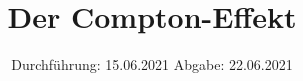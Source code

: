 

\subject{V603}
\title{Der Compton-Effekt}
\date{%
  Durchführung: 15.06.2021
  \hspace{3em}
  Abgabe: 22.06.2021
}



\maketitle
\thispagestyle{empty}
\tableofcontents
\newpage





%

\printbibliography{}



